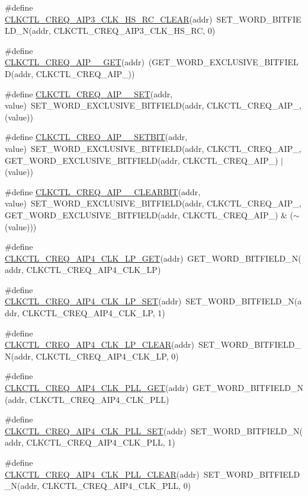 \begin{DoxyCompactItemize}
\#define \hyperlink{a00544_a43a6f8d3641216e412fe61475e0959bb}{CLKCTL\_\-CREQ\_\-AIP3\_\-CLK\_\-HS\_\-RC\_\-CLEAR}(addr)~SET\_\-WORD\_\-BITFIELD\_\-N(addr, CLKCTL\_\-CREQ\_\-AIP3\_\-CLK\_\-HS\_\-RC, 0)
\item 
\#define \hyperlink{a00544_a73bab5d2b4b5818d3a5bd83568b7bd94}{CLKCTL\_\-CREQ\_\-AIP\_\_\-GET}(addr)~(GET\_\-WORD\_\-EXCLUSIVE\_\-BITFIELD(addr, CLKCTL\_\-CREQ\_\-AIP\_))
\item 
\#define \hyperlink{a00544_a6531798def747b5dc544b698e051226a}{CLKCTL\_\-CREQ\_\-AIP\_\_\-SET}(addr, value)~SET\_\-WORD\_\-EXCLUSIVE\_\-BITFIELD(addr, CLKCTL\_\-CREQ\_\-AIP\_, (value))
\item 
\#define \hyperlink{a00544_adadd8c01f278a7a566be6536ec961393}{CLKCTL\_\-CREQ\_\-AIP\_\_\-SETBIT}(addr, value)~SET\_\-WORD\_\-EXCLUSIVE\_\-BITFIELD(addr, CLKCTL\_\-CREQ\_\-AIP\_, GET\_\-WORD\_\-EXCLUSIVE\_\-BITFIELD(addr, CLKCTL\_\-CREQ\_\-AIP\_) $|$ (value))
\item 
\#define \hyperlink{a00544_a80bd828709ea3a8971f0fc22e735d43f}{CLKCTL\_\-CREQ\_\-AIP\_\_\-CLEARBIT}(addr, value)~SET\_\-WORD\_\-EXCLUSIVE\_\-BITFIELD(addr, CLKCTL\_\-CREQ\_\-AIP\_, GET\_\-WORD\_\-EXCLUSIVE\_\-BITFIELD(addr, CLKCTL\_\-CREQ\_\-AIP\_) \& ($\sim$(value)))
\item 
\#define \hyperlink{a00544_add90c274ae512607e77c08a9cf61aaac}{CLKCTL\_\-CREQ\_\-AIP4\_\-CLK\_\-LP\_\-GET}(addr)~GET\_\-WORD\_\-BITFIELD\_\-N(addr, CLKCTL\_\-CREQ\_\-AIP4\_\-CLK\_\-LP)
\item 
\#define \hyperlink{a00544_a3ea439f9eacc597006cc6037800aa866}{CLKCTL\_\-CREQ\_\-AIP4\_\-CLK\_\-LP\_\-SET}(addr)~SET\_\-WORD\_\-BITFIELD\_\-N(addr, CLKCTL\_\-CREQ\_\-AIP4\_\-CLK\_\-LP, 1)
\item 
\#define \hyperlink{a00544_a745f1999d412a5ed0f8bf55b3bdb4998}{CLKCTL\_\-CREQ\_\-AIP4\_\-CLK\_\-LP\_\-CLEAR}(addr)~SET\_\-WORD\_\-BITFIELD\_\-N(addr, CLKCTL\_\-CREQ\_\-AIP4\_\-CLK\_\-LP, 0)
\item 
\#define \hyperlink{a00544_a454f953a89e4ec50419578d1261f99b2}{CLKCTL\_\-CREQ\_\-AIP4\_\-CLK\_\-PLL\_\-GET}(addr)~GET\_\-WORD\_\-BITFIELD\_\-N(addr, CLKCTL\_\-CREQ\_\-AIP4\_\-CLK\_\-PLL)
\item 
\#define \hyperlink{a00544_ae2e8eda2bd3e8cd2a9e3511182c93f5e}{CLKCTL\_\-CREQ\_\-AIP4\_\-CLK\_\-PLL\_\-SET}(addr)~SET\_\-WORD\_\-BITFIELD\_\-N(addr, CLKCTL\_\-CREQ\_\-AIP4\_\-CLK\_\-PLL, 1)
\item 
\#define \hyperlink{a00544_a1108df611a6dacd430e26f114f465c0f}{CLKCTL\_\-CREQ\_\-AIP4\_\-CLK\_\-PLL\_\-CLEAR}(addr)~SET\_\-WORD\_\-BITFIELD\_\-N(addr, CLKCTL\_\-CREQ\_\-AIP4\_\-CLK\_\-PLL, 0)

\end{DoxyCompactItemize}
